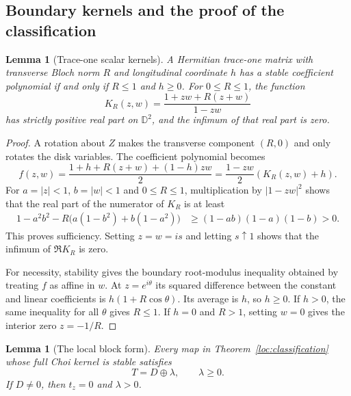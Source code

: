 \documentclass[reqno]{amsart}
\newtheorem{lemma}[theorem]{Lemma}
\theoremstyle{definition}
\theoremstyle{remark}
\newcommand{\D}{\mathbb D}
\begin{document}
\subsection{Boundary kernels and the proof of the classification}

\begin{lemma}[Trace-one scalar kernels]\label{loc:scalar-kernel}
A Hermitian trace-one matrix with transverse Bloch norm $R$ and
longitudinal coordinate $h$ has a stable coefficient polynomial if and
only if $R\leq1$ and $h\geq0$.  For $0\leq R\leq1$, the function
\begin{equation}\label{loc:positive-real}
 K_R(z,w)=\frac{1+zw+R(z+w)}{1-zw}
\end{equation}
has strictly positive real part on $\D^2$, and the infimum of that real
part is zero.
\end{lemma}

\begin{proof}
A rotation about $Z$ makes the transverse component $(R,0)$ and only
rotates the disk variables.  The coefficient polynomial becomes
\[
 f(z,w)=\frac{1+h+R(z+w)+(1-h)zw}{2}
       =\frac{1-zw}{2}(K_R(z,w)+h).
\]
For $a=|z|<1$, $b=|w|<1$ and $0\leq R\leq1$, multiplication by
$|1-zw|^2$ shows that the real part of the numerator of $K_R$ is at
least
\begin{align*}
 1-a^2b^2-R\bigl(a(1-b^2)+b(1-a^2)\bigr)
 &\geq(1-ab)(1-a)(1-b)>0.
\end{align*}
This proves sufficiency.  Setting $z=w=is$ and letting $s\uparrow1$
shows that the infimum of $\Re K_R$ is zero.

For necessity, stability gives the boundary root-modulus inequality
obtained by treating $f$ as affine in $w$.  At $z=e^{i\theta}$ its
squared difference between the constant and linear coefficients is
$h(1+R\cos\theta)$.  Its average is $h$, so $h\geq0$.  If $h>0$,
the same inequality for all $\theta$ gives $R\leq1$.  If $h=0$ and
$R>1$, setting $w=0$ gives the interior zero $z=-1/R$.
\end{proof}

\begin{lemma}[The local block form]\label{loc:block}
Every map in Theorem~\ref{loc:classification} whose full Choi kernel is
stable satisfies
\begin{equation}\label{loc:block-intermediate}
 T=D\oplus\lambda,\qquad\lambda\geq0.
\end{equation}
If $D\ne0$, then $t_z=0$ and $\lambda>0$.
\end{lemma}
\end{document}

